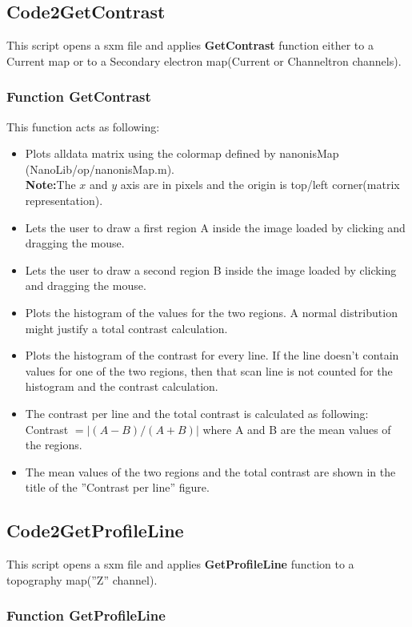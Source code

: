 \subsection{Code2GetContrast}

This script opens a sxm file and applies \textbf{GetContrast} function either to a Current map or to a Secondary electron map(Current or Channeltron channels).

\subsubsection{Function GetContrast}

This function acts as following:
\begin{itemize}  
\item Plots alldata matrix using the colormap defined by nanonisMap (NanoLib/op/nanonisMap.m).\\
\textbf{Note:}The $x$ and $y$ axis are in pixels and the origin is top/left corner(matrix representation).
\item Lets the user to draw a first region A inside the image loaded by clicking 
  and dragging the mouse.
\item Lets the user to draw a second region B inside the image loaded by clicking 
  and dragging the mouse.
\item Plots the histogram of the values for the two regions. A normal distribution might justify a total contrast calculation. 
\item Plots the histogram of the contrast for every line. If the line doesn't contain values for one of the two regions, then that scan line is not counted for the histogram and the contrast calculation.
\item The contrast per line and the total contrast is calculated as following: Contrast $= |(A - B)/(A + B)|$ where A and B are the mean values of the regions.
\item The mean values of the two regions and the total contrast are shown in the title of the ''Contrast per line'' figure.
\end{itemize}

\subsection{Code2GetProfileLine}

This script opens a sxm file and applies \textbf{GetProfileLine} function to a topography map(''Z'' channel).

\subsubsection{Function GetProfileLine}

